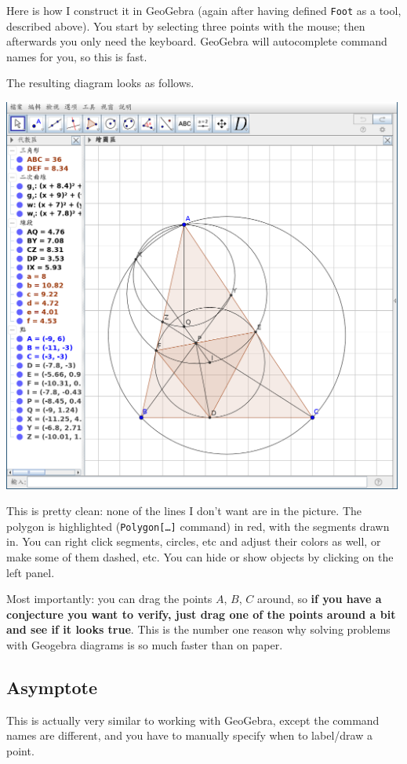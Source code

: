 \documentclass[11pt]{scrartcl}
\begin{document}
Here is how I construct it in GeoGebra
(again after having defined \texttt{Foot} as a tool, described above).
You start by selecting three points with the mouse;
then afterwards you only need the keyboard.
GeoGebra will autocomplete command names for you,
so this is fast.


The resulting diagram looks as follows.
\begin{center}
  \includegraphics[width=0.99\textwidth]{demos/hmmt-demo.png}
\end{center}
This is pretty clean: none of the lines I don't want are in the picture.
The polygon is highlighted (\texttt{Polygon[\dots]} command) in red,
with the segments drawn in.
You can right click segments, circles, etc and adjust their colors as well,
or make some of them dashed, etc.
You can hide or show objects by clicking on the left panel.

Most importantly: you can drag the points $A$, $B$, $C$ around,
so \textbf{if you have a conjecture you want to verify,
just drag one of the points around a bit and see if it looks true}.
This is the number one reason why solving problems with Geogebra
diagrams is so much faster than on paper.

\subsection{Asymptote}
This is actually very similar to working with GeoGebra,
except the command names are different,
and you have to manually specify when to label/draw a point.
\end{document}
